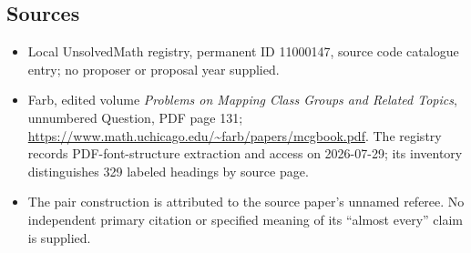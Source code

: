 \documentclass[11pt]{article}
\begin{document}
\subsection{Sources}
\begin{itemize}
\item Local UnsolvedMath registry, permanent ID 11000147, source code catalogue entry; no proposer or proposal year supplied.
\item Farb, edited volume \emph{Problems on Mapping Class Groups and Related Topics}, unnumbered Question, PDF page 131; \url{https://www.math.uchicago.edu/~farb/papers/mcgbook.pdf}. The registry records PDF-font-structure extraction and access on 2026-07-29; its inventory distinguishes 329 labeled headings by source page.
\item The pair construction is attributed to the source paper's unnamed referee. No independent primary citation or specified meaning of its ``almost every'' claim is supplied.
\end{itemize}
\end{document}
